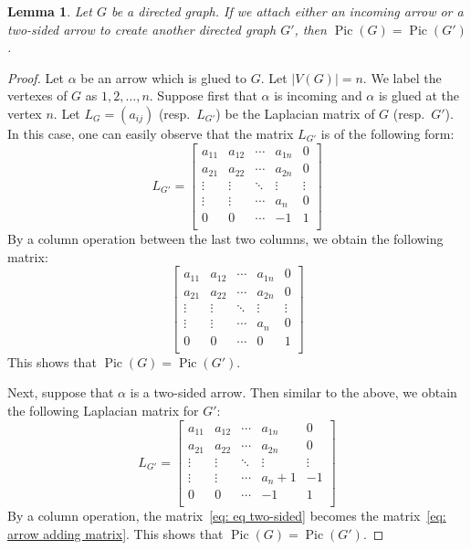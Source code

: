 \documentclass[11pt,reqno]{amsart}
\DeclareMathOperator{\Pic}{Pic}
\theoremstyle{definition}
\theoremstyle{plain}
\newtheorem{lem}[mydef]{\textbf{Lemma}}
\begin{document}
\begin{lem}\label{proposition: gluing an arrow proposition}
Let $G$ be a directed graph. If we attach either an incoming arrow or a two-sided arrow to create another directed graph $G'$, then $\Pic(G)=\Pic(G')$.
\end{lem}
\begin{proof}
Let $\alpha$ be an arrow which is glued to $G$. Let $|V(G)|=n$. We label the vertexes of $G$ as $1,2,\dots,n$. Suppose first that $\alpha$ is incoming and $\alpha$ is glued at the vertex $n$. Let $L_G=(a_{ij})$ (resp.~$L_{G'}$) be the Laplacian matrix of $G$ (resp.~$G'$). In this case, one can easily observe that the matrix $L_{G'}$ is of the following form:
\begin{equation}
L_{G'}=\left[\begin{array}{ccc|c|c}
a_{11}&a_{12}&\cdots &a_{1n}&0\\
a_{21}&a_{22}&\cdots &a_{2n}&0\\
\vdots & \vdots &\ddots & \vdots & \vdots \\ \hline
\vdots & \vdots & \cdots&a_n & 0\\ \hline
0&0&\cdots &-1&1\\
\end{array}\right]
\end{equation}
		By a column operation between the last two columns, we obtain the following matrix:
		\begin{equation}\label{eq: arrow adding matrix}
			\left[\begin{array}{ccc|c|c}
				a_{11}&a_{12}&\cdots &a_{1n}&0\\
				a_{21}&a_{22}&\cdots &a_{2n}&0\\
				\vdots & \vdots &\ddots & \vdots & \vdots \\ \hline
				\vdots & \vdots & \cdots&a_n & 0\\ \hline
				0&0&\cdots &0&1\\
			\end{array}\right]
		\end{equation}
		This shows that $\Pic(G)=\Pic(G')$.

		Next, suppose that $\alpha$ is a two-sided arrow. Then similar to the above, we obtain the following Laplacian matrix for $G'$:
		\begin{equation}\label{eq: eq two-sided}
			L_{G'}=\left[\begin{array}{ccc|c|c}
				a_{11}&a_{12}&\cdots &a_{1n}&0\\
				a_{21}&a_{22}&\cdots &a_{2n}&0\\
				\vdots & \vdots &\ddots & \vdots & \vdots \\ \hline
				\vdots & \vdots & \cdots&a_n+1 & -1\\ \hline
				0&0&\cdots &-1&1\\
			\end{array}\right]
		\end{equation}
		By a column operation, the matrix~\eqref{eq: eq two-sided} becomes the matrix~\eqref{eq: arrow adding matrix}.
		This shows that $\Pic(G)=\Pic(G')$.
	\end{proof}
\end{document}
